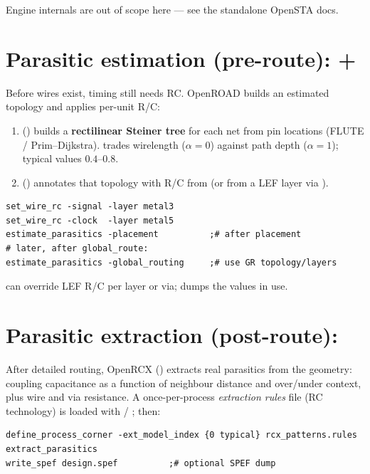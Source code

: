 Engine internals are out of scope here --- see the standalone OpenSTA docs.

\section{Parasitic estimation (pre-route):  + }

Before wires exist, timing still needs RC. OpenROAD builds an estimated
topology and applies per-unit R/C:

\begin{enumerate}
  \item {} () builds a
        \textbf{rectilinear Steiner tree} for each net from pin locations
        (FLUTE / Prim--Dijkstra).  trades wirelength
        ($\alpha{=}0$) against path depth ($\alpha{=}1$); typical values
        $0.4$--$0.8$.
  \item {} () annotates that topology
        with R/C from  (or from a LEF layer via
        ).
\end{enumerate}

\begin{lstlisting}[style=ortcl]
set_wire_rc -signal -layer metal3
set_wire_rc -clock  -layer metal5
estimate_parasitics -placement          ;# after placement
# later, after global_route:
estimate_parasitics -global_routing     ;# use GR topology/layers
\end{lstlisting}

 can override LEF R/C per layer or via;
 dumps the values in use.

\section{Parasitic extraction (post-route): }

After detailed routing, OpenRCX () extracts real parasitics from
the geometry: coupling capacitance as a function of neighbour distance and
over/under context, plus wire and via resistance. A once-per-process
\emph{extraction rules} file (RC technology) is loaded with
 / ; then:

\begin{lstlisting}[style=ortcl]
define_process_corner -ext_model_index {0 typical} rcx_patterns.rules
extract_parasitics
write_spef design.spef          ;# optional SPEF dump
\end{lstlisting}

